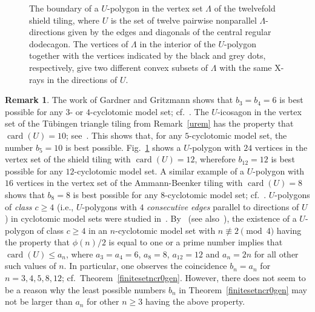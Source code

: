 \documentclass[a4paper]{amsart}
\theoremstyle{definition}
\newtheorem{rem}[theorem]{Remark}
\numberwithin{equation}{section}
\numberwithin{theorem}{section}
\begin{document}
\begin{figure}
\centerline{\textwidth{}}
\caption{The boundary of a $U$-polygon in
  the vertex set $\varLambda$ of the twelvefold 
  shield tiling, where $U$ is the set of
  twelve pairwise nonparallel $\varLambda$-directions
 given by the edges and diagonals of the central regular
 dodecagon. The vertices of $\varLambda$ in the interior of
 the  $U$-polygon together with the vertices indicated by the black and grey dots, respectively,
give two different convex subsets of $\varLambda$ with the same X-rays in the
directions of $U$.}
\label{fig:tilingupolygon}
\end{figure}

\begin{rem}\label{maxrem}
 The work of
Gardner and Gritzmann shows that $b_3=b_4=6$ is best possible for any
$3$- or $4$-cyclotomic model set; cf.~\cite[Example 4.3]{GG}. The $U$-icosagon in the vertex set of the T\"ubingen
 triangle tiling from Remark~\ref{urem} has the property that
 $\operatorname{card}(U)=10$; see~\cite[Figure 1]{H4}. This  shows that, for any $5$-cyclotomic model set, the number $b_5=10$ is best
 possible. Fig.~\ref{fig:tilingupolygon} shows a $U$-polygon with $24$ vertices
 in the vertex set of the
 shield tiling with $\operatorname{card}(U)=12$, wherefore $b_{12}=12$
 is best possible for any $12$-cyclotomic model set. A similar example
 of a $U$-polygon with $16$ vertices  in the vertex set of the
 Ammann-Beenker tiling with $\operatorname{card}(U)=8$ shows that $b_{8}=8$ is
 best possible for any $8$-cyclotomic model set; cf.~\cite[Fig.~2]{H5}. $U$-polygons
 of {\em class $c\geq 4$} (i.e., $U$-polygons with $4$ {\em
   consecutive edges} parallel to directions of $U$) in cyclotomic
 model sets were studied in~\cite{H4}. By~\cite[Corollary 14]{H4} (see
 also~\cite[Thm.~ 12]{DP}), the
 existence of a 
 $U$-polygon of class $c\geq 4$ in an $n$-cyclotomic model set with
 $n\not\equiv 2\pmod 4$ having the property that $\phi(n)/2$ is equal to one or a prime number
 implies that $\operatorname{card}(U)\leq a_n$, where $a_3=a_4=6$, $a_8=8$,
 $a_{12}=12$ and $a_n=2n$ for all other such values of $n$. In particular,
 one observes the coincidence $b_n=a_n$ for $n=3,4,5,8,12$; cf.~Theorem~\ref{finitesetncr0gen}. However, there does not seem to be a reason why the least
 possible numbers $b_n$ in Theorem~\ref{finitesetncr0gen} may not be
 larger than $a_n$ for other $n\geq 3$ having the above property.         
\end{rem}
\end{document}
